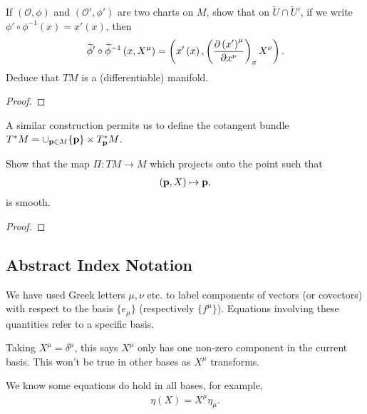 \begin{exercise}
    If $\left( \mathcal{O}, \phi \right) $ and $\left( \mathcal{O}', \phi'\right) $ are two charts on $M$, show that on $\widetilde{U} \cap \widetilde{U}'$, if we write $\phi' \circ \phi^{-1} \left( x \right) = x' \left( x \right) $, then 
    \begin{align}
        \widetilde{\phi}' \circ \widetilde{\phi}^{-1} \left( x, X^{\mu} \right) = \left( x' \left( x \right) , \left( \pdv{\left( x' \right)^{\mu}}{x^{\nu}} \right)_{x} X^{\nu}  \right) 
    .\end{align}
    Deduce that $TM$ is a (differentiable) manifold.
\end{exercise}

\begin{proof}
    
\end{proof}

A similar construction permits us to define the cotangent bundle $T^{*}M = \cup_{\vb{p} \in M} \{\vb{p}\} \times T_{\vb{p}}^{*} M$.

\begin{exercise}
    Show that the map $\Pi : TM \to M$ which projects onto the point such that
    \begin{align}
        \left( \vb{p},X \right) \mapsto \vb{p}
    ,\end{align}
    is smooth.
\end{exercise}

\begin{proof}
    
\end{proof}

\subsection{Abstract Index Notation}

We have used Greek letters $\mu, \nu$ etc. to label components of vectors (or covectors) with respect to the basis $\{e_\mu\} $ (respectively $\{f^{\mu}\} $). Equations involving these quantities refer to a specific basis.

\begin{example}
    Taking $X^{\mu} = \delta^{\mu}$, this says $X^{\mu}$ only has one non-zero component in the current basis. This won't be true in other bases as $X^{\mu}$ transforms.
\end{example}

We know some equations do hold in all bases, for example,
\begin{align}
    \eta \left( X \right) = X^{\mu} \eta_\mu
.\end{align}

